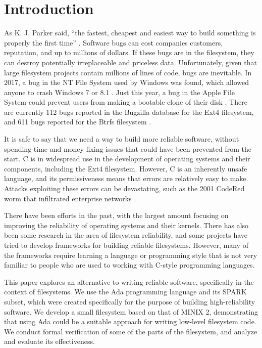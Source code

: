 \section{Introduction}
As K. J. Parker said, ``the fastest, cheapest and easiest way to build something is properly the first time'' \cite{parker2007}.
Software bugs can cost companies customers, reputation, and up to millions of dollars.
If these bugs are in the filesystem, they can destroy potentially irreplaceable and priceless data.
Unfortunately, given that large filesystem projects contain millions of lines of code, bugs are inevitable.
In 2017, a bug in the NT File System used by Windows was found, which allowed anyone to crash Windows 7 or 8.1 \cite{bright2017}.
Just this year, a bug in the Apple File System could prevent users from making a bootable clone of their disk \cite{bombich2020}.
There are currently 112 bugs reported in the Bugzilla database for the Ext4 filesystem, and 611 bugs reported for the Btrfs filesystem \cite{bugzilla2020}.

It is safe to say that we need a way to build more reliable software, without spending time and money fixing issues that could have been prevented from the start.
C is in widespread use in the development of operating systems and their components, including the Ext4 filesystem.
However, C is an inherently unsafe language, and its permissiveness means that errors are relatively easy to make.
Attacks exploiting these errors can be devastating, such as the 2001 CodeRed worm that infiltrated enterprise networks \cite{trendmicro2002}.

There have been efforts in the past, with the largest amount focusing on improving the reliability of operating systems and their kernels.
There has also been some research in the area of filesystem reliability, and some projects have tried to develop frameworks for building reliable filesystems.
However, many of the frameworks require learning a language or programming style that is not very familiar to people who are used to working with C-style programming languages.

This paper explores an alternative to writing reliable software, specifically in the context of filesystems.
We use the Ada programming language and its SPARK subset, which were created specifically for the purpose of building high-reliability software.
We develop a small filesystem based on that of MINIX 2, demonstrating that using Ada could be a suitable approach for writing low-level filesystem code.
We conduct formal verification of some of the parts of the filesystem, and analyze and evaluate its effectiveness.

